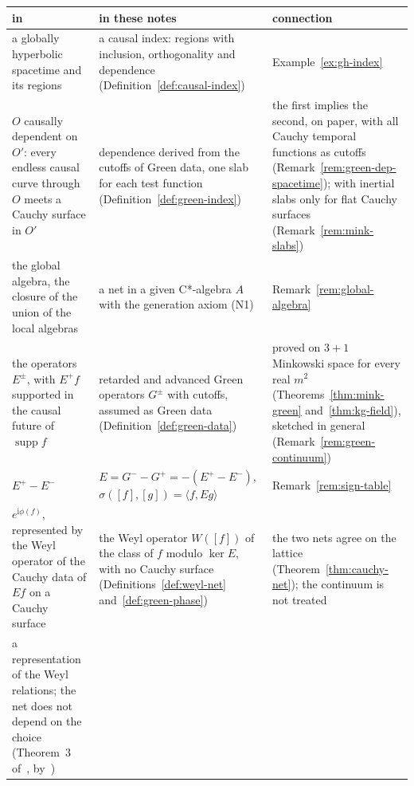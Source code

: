 \documentclass[11pt]{article}
\numberwithin{equation}{section}
\newif\ifdimockedition
\newcommand{\extraonly}[1]{\ifdimockedition\else#1\fi}
\newcommand{\dimockonly}[1]{\ifdimockedition#1\fi}
\theoremstyle{definition}
\theoremstyle{remark}
\theoremstyle{plain}
\newcommand{\ii}{\mathrm i}
\DeclareMathOperator{\supp}{supp}
\newcommand{\revs}[1]{#1}  %
\begin{document}
{\small
\begin{longtable}{@{}>{\raggedright\arraybackslash}p{}>{\raggedright\arraybackslash}p{}>{\raggedright\arraybackslash}p{}@{}}
\toprule
\revs{in~\cite{dimock}} & \revs{in these notes} & \revs{connection} \\
\midrule
\endhead
\revs{a globally hyperbolic spacetime and its regions} &
\revs{a causal index: regions with inclusion, orthogonality and dependence
(Definition~\ref{def:causal-index})} &
\revs{Example~\ref{ex:gh-index}} \\\addlinespace[3pt]
\revs{$O$ causally dependent on $O'$: every endless causal curve through $O$ meets a Cauchy surface
in $O'$} &
\revs{dependence derived from the cutoffs of Green data, one slab for each test function
(Definition~\ref{def:green-index})} &
\revs{the first implies the second, on paper, with all Cauchy temporal functions as cutoffs
(Remark~\ref{rem:green-dep-spacetime}); with inertial slabs only for flat Cauchy surfaces
(Remark~\ref{rem:mink-slabs})} \\\addlinespace[3pt]
\revs{the global algebra, the closure of the union of the local algebras} &
\revs{a net in a given C*-algebra $A$ with the generation axiom (N1)} &
\revs{Remark~\ref{rem:global-algebra}} \\\addlinespace[3pt]
\revs{the operators $E^\pm$, with $E^+f$ supported in the causal future of
$\supp f$~\cite[p.~222]{dimock}} &
\revs{retarded and advanced Green operators $G^\pm$ with cutoffs, assumed as Green data
(Definition~\ref{def:green-data})} &
\revs{proved on $3+1$ Minkowski space for every real $m^2$ (Theorems~\ref{thm:mink-green}
and~\ref{thm:kg-field}), sketched in general (Remark~\ref{rem:green-continuum})} \\\addlinespace[3pt]
\revs{$E^+-E^-$} &
\revs{$E=G^--G^+=-(E^+-E^-)$, $\sigma([f],[g])=\langle f,Eg\rangle$} &
\revs{Remark~\ref{rem:sign-table}} \\\addlinespace[3pt]
\revs{$e^{\ii\phi(f)}$, represented by the Weyl operator of the Cauchy data of $Ef$ on a Cauchy
surface~\cite[\S2]{dimock}} &
\revs{the Weyl operator $W([f])$ of the class of $f$ modulo $\ker E$, with no Cauchy surface
(Definitions~\ref{def:weyl-net} and~\ref{def:green-phase})} &
\revs{the two nets agree on the lattice\extraonly{ (Theorem~\ref{thm:cauchy-net})}\dimockonly{
(full notes)}; the continuum is not treated} \\\addlinespace[3pt]
\revs{a representation of the Weyl relations; the net does not depend on the choice
(Theorem~3 of~\cite{dimock}, by~\cite{slawny})} &

\end{longtable}}
\end{document}
